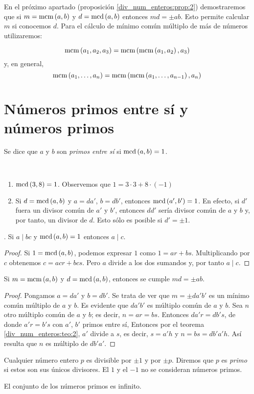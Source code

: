 En el próximo apartado (proposición \ref{div_num_enteros:prop:2}) demostraremos que si $m=\operatorname{\rm mcm}\left(a,b\right)$ y $d=\operatorname{\rm mcd}\left(a,b\right)$ entonces $md=\pm ab$. Esto permite calcular $m$ si conocemos $d$. Para el cálculo de mínimo común múltiplo de más de números utilizaremos:
\begin{ejer}   
    $$\operatorname{\rm mcm}\left(a_1,a_2,a_3\right)=\operatorname{\rm mcm}\left(\operatorname{\rm mcm}\left(a_1,a_2\right),a_3\right)$$
    y, en general,
    $$\operatorname{\rm mcm}\left(a_1,\dots,a_n\right)=\operatorname{\rm mcm}\left(\operatorname{\rm mcm}\left(a_1,\dots,a_{n-1}\right),a_n\right)$$        
\end{ejer}

\section{Números primos entre sí y números primos}

Se dice que $a$ y $b$ son {\it primos entre sí} si $\operatorname{\rm mcd}\left(a,b\right)=1$.
\begin{ejs} \
    \begin{enumerate}[label=(\arabic*)]
        \item $\operatorname{\rm mcd}\left(3,8\right)=1$. Observemos que $1=3\cdot 3 + 8\cdot(-1)$
        \item Si $d=\operatorname{\rm mcd}\left(a,b\right)$ y $a=da'$, $b=db'$, entonces $\operatorname{\rm mcd}\left(a',b'\right)=1$. En efecto, si $d'$ fuera un divisor común de $a'$ y $b'$, entonces $dd'$ sería divisor común de $a$ y $b$ y, por tanto, un divisor de $d$. Esto sólo es posible si $d'=\pm 1$.
    \end{enumerate}    
\end{ejs}

\begin{teo}.\label{div_num_enteros:teo:2}
    Si $a\mid bc$ y $\operatorname{\rm mcd}\left(a,b\right)=1$ entonces $a\mid c$.
\end{teo}

\begin{proof}
    Si $1=\operatorname{\rm mcd}\left(a,b\right)$, podemos expresar $1$ como $1=ar+bs$. Multiplicando por $c$ obtenemos $c=acr+bcs$. Pero $a$ divide a los dos sumandos y, por tanto $a\mid c$.
\end{proof}

\begin{prop}\label{div_num_enteros:prop:2}
    Si $m=\operatorname{\rm mcm}\left(a,b\right)$ y $d=\operatorname{\rm mcd}\left(a,b\right)$, entonces se cumple $md=\pm ab$.
\end{prop}

\begin{proof}
    Pongamos $a=da'$ y $b=db'$. Se trata de ver que $m=\pm da'b'$ es un mínimo común múltiplo de $a$ y $b$. Es evidente que $da'b'$ es múltiplo común de $a$ y $b$. Sea $n$ otro múltiplo común de $a$ y $b$; es decir, $n=ar=bs$. Entonces $da'r=db's$, de donde $a'r=b's$ con $a'$, $b'$ primos entre sí, Entonces por el teorema \ref{div_num_enteros:teo:2}, $a'$ divide a $s$, es decir, $s=a'h$ y $n=bs=db'a'h$. Así resulta que $n$ es múltiplo de $db'a'$.
\end{proof}

Cualquier número entero $p$ es divisible por $\pm 1$ y por $\pm p$. Diremos que $p$ es {\it primo} si estos son sus únicos divisores. El $1$ y el $-1$ no se consideran números primos.

\begin{prop}
    El conjunto de los números primos es infinito.
\end{prop}
